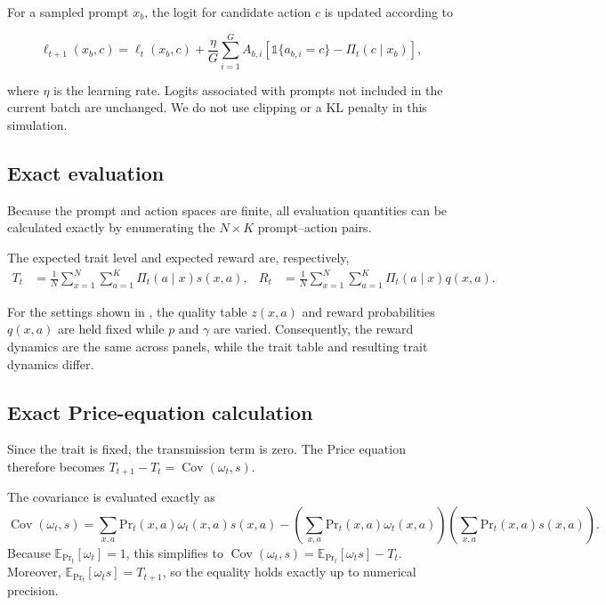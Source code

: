 For a sampled prompt $x_b$, the logit for candidate action $c$ is updated according to

\begin{equation*}
    \ell_{t+1}(x_b,c)
    =
    \ell_t(x_b,c)
    +
    \frac{\eta}{G}
    \sum_{i=1}^{G}
    A_{b,i}
    \left[
        \mathds{1}\{a_{b,i}=c\}
        -
        \Pi_t(c\mid x_b)
    \right],
\end{equation*}

where $\eta$ is the learning rate. Logits associated with prompts not included in the current batch are unchanged. We do not use clipping or a KL penalty in this simulation.

\subsection{Exact evaluation}

Because the prompt and action spaces are finite, all evaluation quantities can be calculated exactly by enumerating the $N\times K$ prompt--action pairs.

The expected trait level and expected reward are, respectively,
\begin{align*}
    T_t
    &=
    \frac{1}{N}
    \sum_{x=1}^{N}
    \sum_{a=1}^{K}
    \Pi_t(a\mid x)s(x,a),
    &
    R_t
    &=
    \frac{1}{N}
    \sum_{x=1}^{N}
    \sum_{a=1}^{K}
    \Pi_t(a\mid x)q(x,a).
\end{align*}

For the settings shown in , the quality table $z(x,a)$ and reward probabilities $q(x,a)$ are held fixed while $p$ and $\gamma$ are varied. Consequently, the reward dynamics are the same across panels, while the trait table and resulting trait dynamics differ.

\subsection{Exact Price-equation calculation}
Since the trait is fixed, the transmission term is zero. The Price equation therefore becomes ${T_{t+1}-T_t=\operatorname{Cov}\left(\omega_t,s\right)}$.

The covariance is evaluated exactly as
\begin{equation*}
    \operatorname{Cov}\left(\omega_t,s\right)
    =
    \sum_{x,a}\text{Pr}_t(x,a)\omega_t(x,a)s(x,a)
    -
    \left(\sum_{x,a}\text{Pr}_t(x,a)\omega_t(x,a)\right)
    \left(\sum_{x,a}\text{Pr}_t(x,a)s(x,a)\right).
\end{equation*}
Because $\mathbb{E}_{\text{Pr}_t}[\omega_t]=1$, this simplifies to $\operatorname{Cov}\left(\omega_t,s\right)=\mathbb{E}_{\text{Pr}_t}[\omega_t s]-T_t$. Moreover, $\mathbb{E}_{\text{Pr}_t}[\omega_t s]=T_{t+1}$, so the equality holds exactly up to numerical precision.

